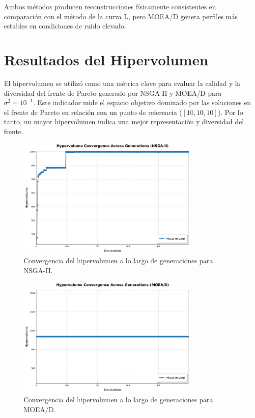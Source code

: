 Ambos métodos producen reconstrucciones físicamente consistentes en comparación con el método de la curva L, pero MOEA/D genera perfiles más estables en condiciones de ruido elevado.

\section{Resultados del Hipervolumen} \label{sec:results:hypervolume}

El hipervolumen se utilizó como una métrica clave para evaluar la calidad y la diversidad del frente de Pareto generado por NSGA-II y MOEA/D para \( \sigma^2 = 10^{-1} \). Este indicador mide el espacio objetivo dominado por las soluciones en el frente de Pareto en relación con un punto de referencia (\( [10,10,10] \)). Por lo tanto, un mayor hipervolumen indica una mejor representación y diversidad del frente.

\begin{figure}[H]
    \centering
    \includegraphics[width=0.8\textwidth]{Images/hypervolume_nsga2.png}
    \caption{Convergencia del hipervolumen a lo largo de generaciones para NSGA-II.}
    \label{fig:hypervolume_nsga2}
\end{figure}

\begin{figure}[H]
    \centering
    \includegraphics[width=0.8\textwidth]{Images/hypervolume_moead.png}
    \caption{Convergencia del hipervolumen a lo largo de generaciones para MOEA/D.}
    \label{fig:hypervolume_moead}
\end{figure}

